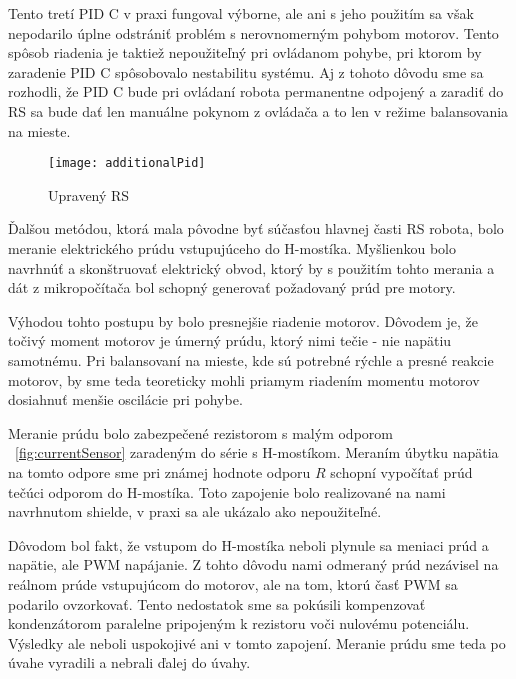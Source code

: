 Tento tretí PID C v praxi fungoval výborne, ale ani s jeho použitím sa však nepodarilo úplne odstrániť problém s nerovnomerným pohybom motorov. Tento spôsob riadenia je taktiež nepoužiteľný pri ovládanom pohybe, pri ktorom by zaradenie PID C spôsobovalo nestabilitu systému. Aj z tohoto dôvodu sme sa rozhodli, že PID C bude pri ovládaní robota permanentne odpojený a zaradiť do RS sa bude dať len manuálne pokynom z ovládača a to len v režime balansovania na mieste. 

\begin{figure}[h]
\centering
\texttt{[image: additionalPid]}
\caption{Upravený RS}
\label{fig:thridPID}
\end{figure}


Ďalšou metódou, ktorá mala pôvodne byť súčasťou hlavnej časti RS robota, bolo meranie elektrického prúdu vstupujúceho do H-mostíka. Myšlienkou bolo navrhnúť a skonštruovať elektrický obvod, ktorý by s použitím tohto merania a dát z mikropočítača bol schopný generovať požadovaný prúd pre motory. 

Výhodou tohto postupu by bolo presnejšie riadenie motorov. Dôvodem je, že točivý moment motorov je úmerný prúdu, ktorý nimi tečie - nie napätiu samotnému. Pri balansovaní na mieste, kde sú potrebné rýchle a presné reakcie motorov, by sme teda teoreticky mohli priamym riadením momentu motorov dosiahnuť menšie oscilácie pri pohybe.

Meranie prúdu bolo zabezpečené rezistorom s malým odporom \figurename~\ref{fig:currentSensor} zaradeným do série s H-mostíkom. Meraním úbytku napätia na tomto odpore sme pri známej hodnote odporu $R$ schopní vypočítať prúd tečúci odporom do H-mostíka. Toto zapojenie bolo realizované na nami navrhnutom shielde, v praxi sa ale ukázalo ako nepoužiteľné.

Dôvodom bol fakt, že vstupom do H-mostíka neboli plynule sa meniaci prúd a napätie, ale PWM napájanie. Z tohto dôvodu nami odmeraný prúd nezávisel na reálnom prúde vstupujúcom do motorov, ale na tom, ktorú časť PWM sa podarilo ovzorkovať. Tento nedostatok sme sa pokúsili kompenzovať kondenzátorom paralelne pripojeným k rezistoru voči nulovému potenciálu. Výsledky ale neboli uspokojivé ani v tomto zapojení. Meranie prúdu sme teda po úvahe vyradili a nebrali ďalej do úvahy.



 
  

 
